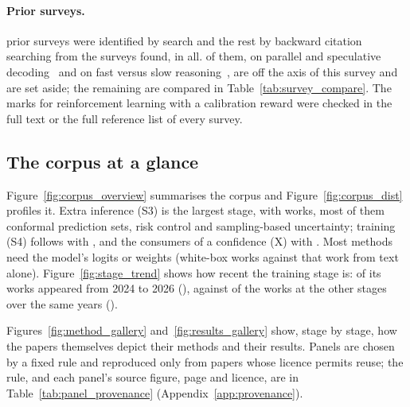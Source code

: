 \paragraph{Prior surveys.} \nSurveysPhaseOne prior surveys were identified by search and the rest by
backward citation searching from the surveys found, \nSurveys in all. \nSurveysOffAxis of them, on parallel
and speculative decoding~\citep{xiao2023survey,li2025surveydiffusion,yu2025discrete,gwak2026accelerating,xia2024unlocking,hu2025speculative,ryu2024closer,zhou2024survey}
and on fast versus slow reasoning~\citep{li2025system,sui2025stop}, are off the axis of this survey
and are set aside; the remaining \nSurveysCompared are compared in Table~\ref{tab:survey_compare}. The
marks for reinforcement learning with a calibration reward were checked in the full text or the full
reference list of every survey.

\subsection{The corpus at a glance}
\label{sec:glance}

Figure~\ref{fig:corpus_overview} summarises the corpus and Figure~\ref{fig:corpus_dist} profiles it.
Extra inference (S3) is the largest stage, with \nSthree works, most of them conformal prediction sets,
risk control and sampling-based uncertainty; training (S4) follows with \nSfour, and the consumers of a
confidence (X) with \nX. Most
methods need the model's logits or weights (\nWhite white-box works against \nBlack that work from text
alone). Figure~\ref{fig:stage_trend} shows how recent the training stage is: \nCoreRecent of its
\nCore works appeared from 2024 to 2026 (\nCoreRecentPct), against \nBgRecent of the \nSzeroToSthree works at
the other stages over the same years (\nBgRecentPct).





Figures~\ref{fig:method_gallery} and~\ref{fig:results_gallery} show, stage by stage, how the papers
themselves depict their methods and their results. Panels are chosen by a fixed rule and reproduced only
from papers whose licence permits reuse; the rule, and each panel's source figure, page and licence, are
in Table~\ref{tab:panel_provenance} (Appendix~\ref{app:provenance}).




